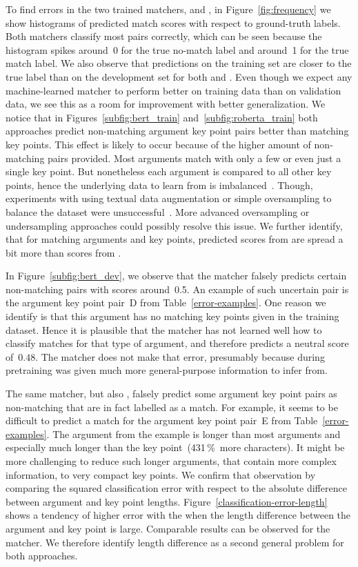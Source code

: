 To find errors in the two trained matchers, \BertBase and \RobertaBase, in Figure~\ref{fig:frequency} we show histograms of predicted match scores with respect to ground-truth labels.
Both matchers classify most pairs correctly, which can be seen because the histogram spikes around~0 for the true no-match label and around~1 for the true match label.
We also observe that predictions on the training set are closer to the true label than on the development set for both \RobertaBase and \BertBase.
Even though we expect any machine-learned matcher to perform better on training data than on validation data, we see this as a room for improvement with better generalization.
We notice that in Figures~\ref{subfig:bert_train} and~\ref{subfig:roberta_train} both approaches predict non-matching argument key point pairs better than matching key points.
This effect is likely to occur because of the higher amount of non-matching pairs provided.
Most arguments match with only a few or even just a single key point.
But nonetheless each argument is compared to all other key points, hence the underlying data to learn from is imbalanced~\cite{BarandelaVSF2004}.
Though, experiments with using textual data augmentation or simple oversampling to balance the dataset were unsuccessful~\cite{Dietterich1995}.
More advanced oversampling or undersampling approaches could possibly resolve this issue.
We further identify, that for matching arguments and key points, predicted scores from \BertBase are spread a bit more than scores from \RobertaBase.

In Figure~\ref{subfig:bert_dev}, we observe that the \BertBase matcher falsely predicts certain non-matching pairs with scores around~0.5.
An example of such uncertain pair is the argument key point pair~D from Table~\ref{error-examples}.
One reason we identify is that this argument has no matching key points given in the training dataset.
Hence it is plausible that the \BertBase matcher has not learned well how to classify matches for that type of argument, and therefore predicts a neutral score of~\(0.48\).
The \RobertaBase matcher does not make that error, presumably because during pretraining \Roberta was given much more general-purpose information to infer from.

The same \BertBase matcher, but also \RobertaBase, falsely predict some argument key point pairs as non-matching that are in fact labelled as a match.
For example, it seems to be difficult to predict a match for the argument key point pair~E from Table~\ref{error-examples}.
The argument from the example is longer than most arguments and especially much longer than the key point~(431\,\%~more characters).
It might be more challenging to reduce such longer arguments, that contain more complex information, to very compact key points.
We confirm that observation by comparing the squared classification error with respect to the absolute difference between argument and key point lengths.
Figure~\ref{classification-error-length} shows a tendency of higher error with the \BertBase when the length difference between the argument and key point is large.
Comparable results can be observed for the \RobertaBase matcher.
We therefore identify length difference as a second general problem for both approaches.
